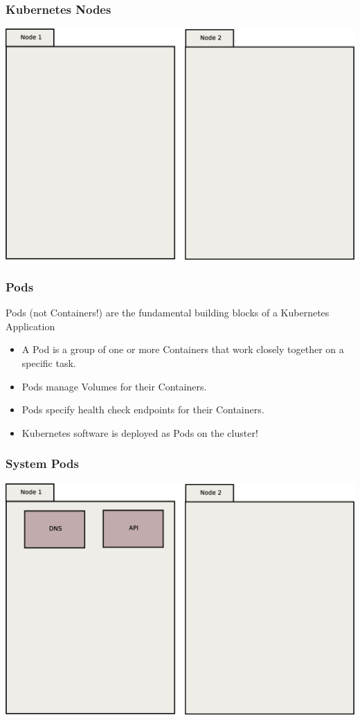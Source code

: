     \begin{frame}
        \frametitle{Kubernetes Nodes}
        \includegraphics[width=\textwidth,height=0.85\textheight,keepaspectratio]{graphics/00-nodes.eps}
    \end{frame}

    \begin{frame}
        \frametitle{Pods}
        Pods (not Containers!) are the fundamental building blocks of a Kubernetes Application\pause
        \begin{itemize}
            \item A Pod is a group of one or more Containers that work closely together on a specific task.\pause
            \item Pods manage Volumes for their Containers.\pause
            \item Pods specify health check endpoints for their Containers.\pause
            \item Kubernetes software is deployed as Pods on the cluster!
        \end{itemize}
    \end{frame}

    \begin{frame}
        \frametitle{System Pods}
        \includegraphics[width=\textwidth,height=0.85\textheight,keepaspectratio]{graphics/01-systemPods.eps}
    \end{frame}


